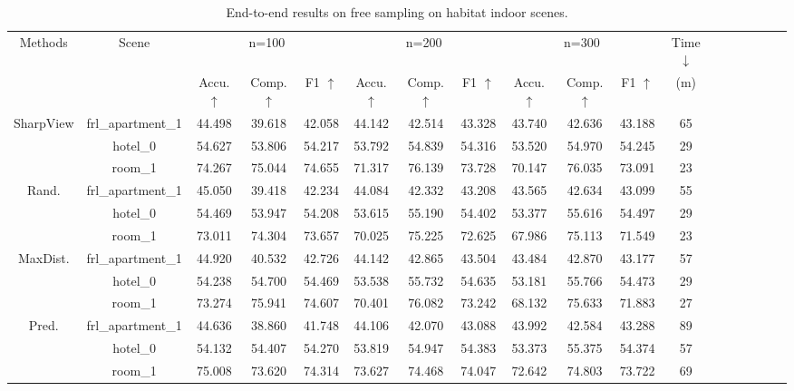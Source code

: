 \begin{table*}[htb]
    \centering
    \label{habitat}
    \caption{End-to-end results on free sampling on habitat indoor scenes.}
    \begin{tabular}{|c|c|c|c|c|c|c|c|c|c|c|c|c|c|c|c|c|c|}
        \hline
        \multirow{2}{*}{Methods} & \multirow{2}{*}{Scene} & \multicolumn{3}{c|}{n=100}& \multicolumn{3}{c|}{n=200}& \multicolumn{3}{c|}{n=300} & Time $\downarrow$\\ \cline{3-11} 
        &  & Accu.$\uparrow$ & Comp. $\uparrow$& F1 $\uparrow$ & Accu.$\uparrow$ & Comp. $\uparrow$& F1 $\uparrow$& Accu. $\uparrow$& Comp. $\uparrow$& F1 $\uparrow$& (m) \\ \hline
        \multirow{3}{*}{SharpView} & frl\_apartment\_1 & 44.498& 39.618& 42.058
            & 44.142& 42.514& 43.328
                & 43.740& 42.636& 43.188 & 65\\    \cline{2-12}
            & hotel\_0 & 54.627& 53.806& 54.217
            & 53.792& 54.839& 54.316
                & 53.520& 54.970& 54.245 & 29\\                 \cline{2-12}
            & room\_1 &74.267 & 75.044  & 74.655
            & 71.317 & 76.139 & 73.728
                & 70.147 & 76.035 & 73.091 & 23\\                      \hline
        \multirow{3}{*}{Rand.}  & frl\_apartment\_1 &45.050& 39.418& 42.234
        & 44.084& 42.332& 43.208
            & 43.565& 42.634& 43.099 & 55\\    \cline{2-12}
            & hotel\_0 & 54.469& 53.947& 54.208
            & 53.615& 55.190& 54.402
                & 53.377& 55.616& 54.497& 29\\                 \cline{2-12}
            & room\_1 &73.011& 74.304& 73.657 
            & 70.025& 75.225& 72.625
                &67.986& 75.113& 71.549 & 23 \\                      \hline
        \multirow{3}{*}{MaxDist.} & frl\_apartment\_1 & 44.920 & 40.532 & 42.726
        & 44.142 & 42.865 & 43.504
            & 43.484 & 42.870 & 43.177 & 57\\    \cline{2-12}
            & hotel\_0 & 54.238& 54.700& 54.469
            & 53.538& 55.732& 54.635
                & 53.181& 55.766& 54.473 & 29\\                 \cline{2-12}
            & room\_1 & 73.274 & 75.941 & 74.607
            &70.401 & 76.082 & 73.242 &
            68.132 & 75.633 & 71.883& 27\\                      \hline
        \multirow{3}{*}{Pred.} & frl\_apartment\_1 & 44.636& 38.860& 41.748
            & 44.106& 42.070& 43.088
                & 43.992& 42.584& 43.288 & 89\\    \cline{2-12}
            & hotel\_0 & 54.132& 54.407& 54.270
            & 53.819& 54.947& 54.383
                & 53.373& 55.375& 54.374 & 57\\                 \cline{2-12}
            & room\_1 & 75.008& 73.620& 74.314
            & 73.627& 74.468& 74.047
                & 72.642& 74.803& 73.722& 69\\                      \hline
    \end{tabular}
\end{table*}
